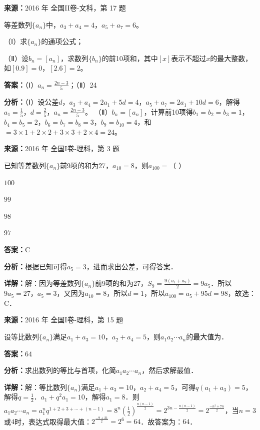 \begin{question}[points=12]
\textbf{来源：}2016 年 全国II卷-文科，第 17 题\par
等差数列$\{a_n\}$中，$a_3+a_4=4$，$a_5+a_7=6$。

（Ⅰ）求$\{a_n\}$的通项公式；

（Ⅱ）设$b_n=[a_n]$，求数列$\{b_n\}$的前10项和，其中$[x]$表示不超过$x$的最大整数，如$[0.9]=0$，$[2.6]=2$。
\begin{solution}
\textbf{答案：}（Ⅰ）$a_n=\frac{2n-3}{5}$；（Ⅱ）24

\textbf{分析：}（Ⅰ）设公差$d$，$a_3+a_4=2a_1+5d=4$，$a_5+a_7=2a_1+10d=6$，解得$a_1=\frac{1}{5}$，$d=\frac{2}{5}$，$a_n=\frac{2n-3}{5}$。
（Ⅱ）$b_n=[a_n]$，计算前10项得$b_1=b_2=b_3=1$，$b_4=b_5=2$，$b_6=b_7=b_8=3$，$b_9=b_{10}=4$，和$=3\times1+2\times2+3\times3+2\times4=24$。
\end{solution}
\end{question}

\begin{question}[points=5]
\textbf{来源：}2016 年 全国I卷-理科，第 3 题\par
已知等差数列$\{a_n\}$前9项的和为27，$a_{10}=8$，则$a_{100}=$（ ）
\begin{choices}
  \item $100$
  \item $99$
  \item $98$
  \item $97$
\end{choices}
\begin{solution}
\textbf{答案：}C

\textbf{分析：}根据已知可得$a_5=3$，进而求出公差，可得答案．

\textbf{详解：}解：因为等差数列$\{a_n\}$前9项的和为27，$S_9=\frac{9(a_1+a_9)}{2}=9a_5$．所以$9a_5=27$，$a_5=3$，又因为$a_{10}=8$，所以$d=1$，所以$a_{100}=a_5+95d=98$，故选：C．
\end{solution}
\end{question}

\begin{question}[points=5]
\textbf{来源：}2016 年 全国I卷-理科，第 15 题\par
设等比数列$\{a_n\}$满足$a_1+a_3=10$，$a_2+a_4=5$，则$a_1a_2\cdots a_n$的最大值为．
\fillin[{$64$}]
\begin{solution}
\textbf{答案：}$64$

\textbf{分析：}求出数列的等比与首项，化简$a_1a_2\cdots a_n$，然后求解最值．

\textbf{详解：}解：等比数列$\{a_n\}$满足$a_1+a_3=10$，$a_2+a_4=5$，可得$q(a_1+a_3)=5$，解得$q=\frac{1}{2}$．$a_1+q^2a_1=10$，解得$a_1=8$．则$a_1a_2\cdots a_n=a_1^n q^{1+2+3+\cdots+(n-1)}=8^n \left(\frac{1}{2}\right)^{\frac{n(n-1)}{2}}=2^{3n-\frac{n(n-1)}{2}}=2^{\frac{-n^2+7n}{2}}$，当$n=3$或$4$时，表达式取得最大值：$2^{\frac{-9+21}{2}}=2^6=64$．故答案为：$64$．
\end{solution}
\end{question}

